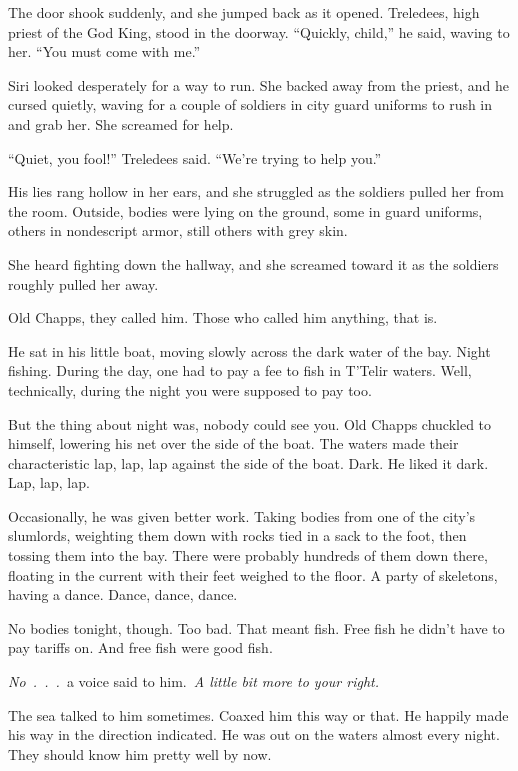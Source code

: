 The door shook suddenly, and she jumped back as it opened. Treledees, high priest of the God King, stood in the doorway. “Quickly, child,” he said, waving to her. “You must come with me.”

Siri looked desperately for a way to run. She backed away from the priest, and he cursed quietly, waving for a couple of soldiers in city guard uniforms to rush in and grab her. She screamed for help.

“Quiet, you fool!” Treledees said. “We’re trying to help you.”

His lies rang hollow in her ears, and she struggled as the soldiers pulled her from the room. Outside, bodies were lying on the ground, some in guard uniforms, others in nondescript armor, still others with grey skin.

She heard fighting down the hallway, and she screamed toward it as the soldiers roughly pulled her away.

\orn

Old Chapps, they called him. Those who called him anything, that is.

He sat in his little boat, moving slowly across the dark water of the bay. Night fishing. During the day, one had to pay a fee to fish in T’Telir waters. Well, technically, during the night you were supposed to pay too.

But the thing about night was, nobody could see you. Old Chapps chuckled to himself, lowering his net over the side of the boat. The waters made their characteristic lap, lap, lap against the side of the boat. Dark. He liked it dark. Lap, lap, lap.

Occasionally, he was given better work. Taking bodies from one of the city’s slumlords, weighting them down with rocks tied in a sack to the foot, then tossing them into the bay. There were probably hundreds of them down there, floating in the current with their feet weighed to the floor. A party of skeletons, having a dance. Dance, dance, dance.

No bodies tonight, though. Too bad. That meant fish. Free fish he didn’t have to pay tariffs on. And free fish were good fish.

\textit{No~.~.~.}~a voice said to him.~\textit{A little bit more to your right.}

The sea talked to him sometimes. Coaxed him this way or that. He happily made his way in the direction indicated. He was out on the waters almost every night. They should know him pretty well by now.

